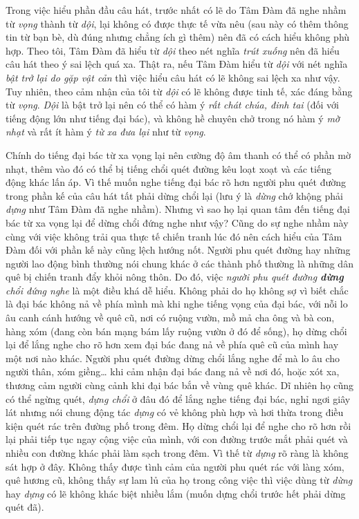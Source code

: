 \documentclass[../main.tex]{subfiles}
\begin{document}
\begin{multicols}{2}
Trong việc hiểu phần đầu câu hát, trước nhất có lẽ do Tâm Đàm đã nghe nhầm từ \textit{vọng} thành từ \textit{dội}, lại không có được thực tế vừa nêu (sau này có thêm thông tin từ bạn bè, dù đúng nhưng chẳng ích gì thêm) nên đã có cách hiểu không phù hợp. Theo tôi, Tâm Đàm đã hiểu từ \textit{dội} theo nét nghĩa \textit{trút xuống} nên đã hiểu câu hát theo ý sai lệch quá xa. Thật ra, nếu Tâm Đàm hiểu từ \textit{dội} với nét nghĩa \textit{bật trở lại do gặp vật cản} thì việc hiểu câu hát có lẽ không sai lệch xa như vậy. Tuy nhiên, theo cảm nhận của tôi từ \textit{dội} có lẽ không được tinh tế, xác đáng bằng từ \textit{vọng}. \textit{Dội} là bật trở lại nên có thể có hàm ý \textit{rất chát chúa, đinh tai} (đối với tiếng động lớn như tiếng đại bác), và không hề chuyên chở trong nó hàm ý \textit{mờ nhạt} và rất ít hàm ý \textit{từ xa đưa lại} như từ \textit{vọng}.   
 
Chính do tiếng đại bác từ xa vọng lại nên cường độ âm thanh có thể có phần mờ nhạt, thêm vào đó có thể bị tiếng chổi quét đường kêu loạt xoạt và các tiếng động khác lấn áp. Vì thế muốn nghe tiếng đại bác rõ hơn người phu quét đường trong phần kế của câu hát tất phải dừng chổi lại (lưu ý là \textit{dừng} chớ khộng phải \textit{dựng} như Tâm Đàm đã nghe nhầm). Nhưng vì sao họ lại quan tâm đến tiếng đại bác từ xa vọng lại để dừng chổi đứng nghe như vậy? Cũng do sự nghe nhầm này cùng với việc không trải qua thực tế chiến tranh lúc đó nên cách hiểu của Tâm Đàm đối với phần kế này cũng lệch hướng nốt.  Người phu quét đường hay những người lao động bình thường nói chung khác ở các thành phố thường là những dân quê bị chiến tranh đẩy khỏi nông thôn. Do đó, việc \textit{người phu quét đường \textbf{dừng} chổi đứng nghe} là một điều khá dễ hiểu. Không phải do họ không sợ vì biết chắc là đại bác không nả về phía mình mà khi nghe tiếng vọng của đại bác, với nỗi lo âu canh cánh hướng về quê cũ, nơi có ruộng vườn, mồ mả cha ông và bà con, hàng xóm (đang còn bán mạng bám lấy ruộng vườn ở đó để sống), họ dừng chổi lại để lắng nghe cho rõ hơn xem đại bác đang nả về phía quê cũ của mình hay một nơi nào khác. Người phu quét đường dừng chổi lắng nghe để mà lo âu cho người thân, xóm giềng… khi cảm nhận đại bác đang nả về nơi đó, hoặc xót xa, thương cảm người cùng cảnh khi đại bác bắn về vùng quê khác. Dĩ nhiên họ cũng có thể ngừng quét, \textit{dựng chổi} ở đâu đó để lắng nghe tiếng đại bác, nghỉ ngơi giây lát nhưng nói chung động tác \textit{dựng} có vẻ không phù hợp và hơi thừa trong điều kiện quét rác trên đường phố trong đêm. Họ dừng chổi lại để nghe cho rõ hơn rồi lại phải tiếp tục ngay cộng việc của mình, với con đường trước mắt phải quét và nhiều con đường khác phải làm sạch trong đêm. Vì thế từ \textit{dựng} rõ ràng là không sát hợp ở đây. Không thấy được tình cảm của người phu quét rác với làng xóm, quê hương cũ, không thấy sự lam lủ của họ trong công việc thì việc dùng từ \textit{dừng} hay \textit{dựng}  có lẽ không khác biệt nhiều lắm (muốn dựng chổi trước hết phải dừng quét đã). 
 

\end{multicols}
\end{document}
